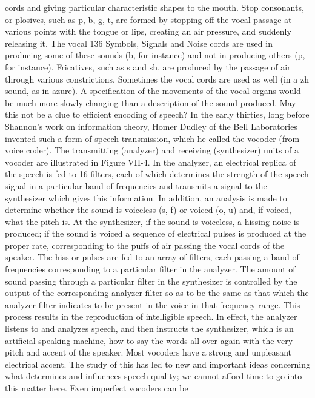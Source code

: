 {{{cords and giving particular characteristic shapes to the mouth.
Stop consonants, or plosives, such as p, b, g, t, are formed by
stopping off the vocal passage at various points with the tongue
or lips, creating an air pressure, and suddenly releasing it. The vocal
136
Symbols, Signals and Noise
cords are used in producing some of these sounds (b, for instance)
and not in producing others (p, for instance).
Fricatives, such as s and sh, are produced by the passage of air
through various constrictions. Sometimes the vocal cords are used
as well (in a zh sound, as in azure).
A specification of the movements of the vocal organs would be
much more slowly changing than a description of the sound produced.
May this not be a clue to efficient encoding of speech?
In the early thirties, long before Shannon’s work on information
theory, Homer Dudley of the Bell Laboratories invented such a
form of speech transmission, which he called the vocoder (from
voice coder). The transmitting (analyzer) and receiving (synthesizer)
units of a vocoder are illustrated in Figure VII-4.
In the analyzer, an electrical replica of the speech is fed to 16
filters, each of which determines the strength of the speech signal
in a particular band of frequencies and transmits a signal to the
synthesizer which gives this information. In addition, an analysis
is made to determine whether the sound is voiceless (s, f) or voiced
(o, u) and, if voiced, what the pitch is.
At the synthesizer, if the sound is voiceless, a hissing noise is
produced; if the sound is voiced a sequence of electrical pulses is
produced at the proper rate, corresponding to the puffs of air
passing the vocal cords of the speaker.
The hiss or pulses are fed to an array of filters, each passing a
band of frequencies corresponding to a particular filter in the
analyzer. The amount of sound passing through a particular filter
in the synthesizer is controlled by the output of the corresponding
analyzer filter so as to be the same as that which the analyzer filter
indicates to be present in the voice in that frequency range.
This process results in the reproduction of intelligible speech.
In effect, the analyzer listens to and analyzes speech, and then
instructs the synthesizer, which is an artificial speaking machine,
how to say the words all over again with the very pitch and accent
of the speaker.
Most vocoders have a strong and unpleasant electrical accent.
The study of this has led to new and important ideas concerning
what determines and influences speech quality; we cannot afford
time to go into this matter here. Even imperfect vocoders can be
}}}
